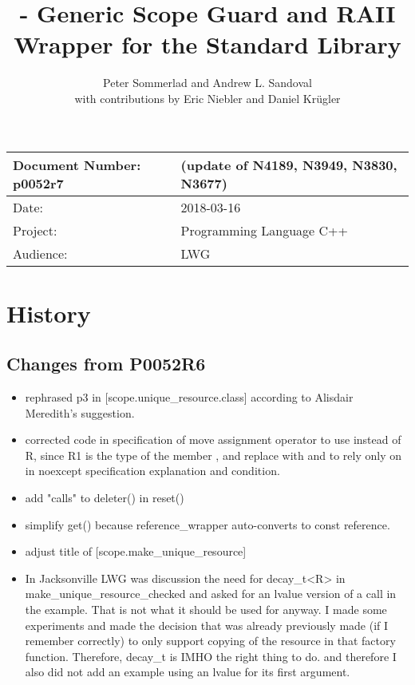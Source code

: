 \documentclass[ebook,11pt,article]{memoir}
\title{\papernumber{} - Generic Scope Guard and RAII Wrapper for the Standard Library}
\author{Peter Sommerlad and Andrew L. Sandoval\\with contributions by Eric Niebler and Daniel Kr\"ugler}
\date{\paperdate}                        %
\newcommand{\papernumber}{p0052r7}
\newcommand{\paperdate}{2018-03-16}
\begin{document}
\maketitle
\begin{tabular}[t]{|l|l|}\hline 
Document Number: \papernumber &   (update of N4189, N3949, N3830, N3677)\\\hline
Date: & \paperdate \\\hline
Project: & Programming Language C++\\\hline 
Audience: & LWG\\\hline
\end{tabular}

\chapter{History}
\section{Changes from P0052R6}
\begin{itemize}
\item rephrased p3 in [scope.unique_resource.class] according to Alisdair Meredith's suggestion.
\item corrected code in specification of  move assignment operator to use  instead of R, since R1 is the type of the member , and replace  with  and to rely only on  in noexcept specification explanation and  condition.
\item add "calls" to deleter() in reset()
\item simplify get() because reference_wrapper auto-converts to const reference.
\item adjust title of [scope.make_unique_resource]
\item In Jacksonville LWG was discussion the need for decay_t<R> in make_unique_resource_checked and asked for an lvalue version of a call in the example. That is not what it should be used for anyway. I made some experiments and made the decision that was already previously made (if I remember correctly) to only support copying of the resource in that factory function. Therefore, decay_t is IMHO the right thing to do. and therefore I also did not add an example using an lvalue for its first argument.
\end{itemize}
\end{document}
